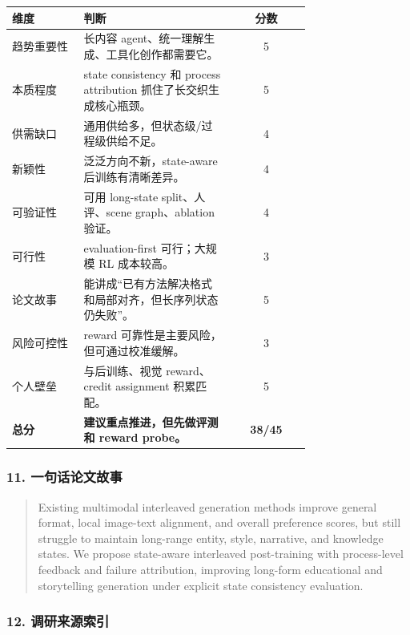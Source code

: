 \begin{center}
\begin{tabular}{p{0.24\linewidth} p{0.50\linewidth} c}
\toprule
\textbf{维度} & \textbf{判断} & \textbf{分数} \\
\midrule
趋势重要性 & 长内容 agent、统一理解生成、工具化创作都需要它。 & 5 \\
本质程度 & state consistency 和 process attribution 抓住了长交织生成核心瓶颈。 & 5 \\
供需缺口 & 通用供给多，但状态级/过程级供给不足。 & 4 \\
新颖性 & 泛泛方向不新，state-aware 后训练有清晰差异。 & 4 \\
可验证性 & 可用 long-state split、人评、scene graph、ablation 验证。 & 4 \\
可行性 & evaluation-first 可行；大规模 RL 成本较高。 & 3 \\
论文故事 & 能讲成“已有方法解决格式和局部对齐，但长序列状态仍失败”。 & 5 \\
风险可控性 & reward 可靠性是主要风险，但可通过校准缓解。 & 3 \\
个人壁垒 & 与后训练、视觉 reward、credit assignment 积累匹配。 & 5 \\
\midrule
\textbf{总分} & \textbf{建议重点推进，但先做评测和 reward probe。} & \textbf{38/45} \\
\bottomrule
\end{tabular}
\end{center}

\subsubsection*{11. 一句话论文故事}

\begin{quote}
Existing multimodal interleaved generation methods improve general format, local image-text alignment, and overall preference scores, but still struggle to maintain long-range entity, style, narrative, and knowledge states. We propose state-aware interleaved post-training with process-level feedback and failure attribution, improving long-form educational and storytelling generation under explicit state consistency evaluation.
\end{quote}

\subsubsection*{12. 调研来源索引}

